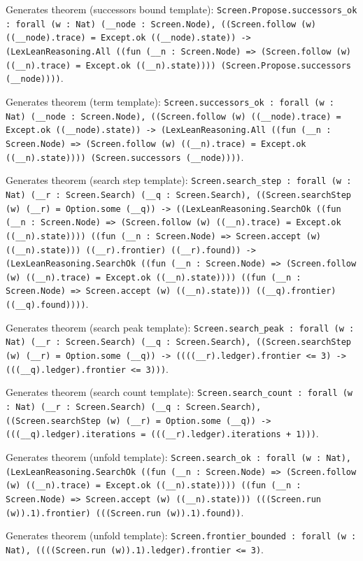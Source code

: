 \documentclass[11pt]{article}
\begin{document}
\noindent Generates theorem (successors bound template): \texttt{Screen.Propose.successors\_ok : forall (w : Nat) (\_\_node : Screen.Node), ((Screen.follow (w) ((\_\_node).trace) = Except.ok ((\_\_node).state)) -> (LexLeanReasoning.All ((fun (\_\_n : Screen.Node) => (Screen.follow (w) ((\_\_n).trace) = Except.ok ((\_\_n).state)))) (Screen.Propose.successors (\_\_node))))}.\par
\noindent Generates theorem (term template): \texttt{Screen.successors\_ok : forall (w : Nat) (\_\_node : Screen.Node), ((Screen.follow (w) ((\_\_node).trace) = Except.ok ((\_\_node).state)) -> (LexLeanReasoning.All ((fun (\_\_n : Screen.Node) => (Screen.follow (w) ((\_\_n).trace) = Except.ok ((\_\_n).state)))) (Screen.successors (\_\_node))))}.\par
\noindent Generates theorem (search step template): \texttt{Screen.search\_step : forall (w : Nat) (\_\_r : Screen.Search) (\_\_q : Screen.Search), ((Screen.searchStep (w) (\_\_r) = Option.some (\_\_q)) -> ((LexLeanReasoning.SearchOk ((fun (\_\_n : Screen.Node) => (Screen.follow (w) ((\_\_n).trace) = Except.ok ((\_\_n).state)))) ((fun (\_\_n : Screen.Node) => Screen.accept (w) ((\_\_n).state))) ((\_\_r).frontier) ((\_\_r).found)) -> (LexLeanReasoning.SearchOk ((fun (\_\_n : Screen.Node) => (Screen.follow (w) ((\_\_n).trace) = Except.ok ((\_\_n).state)))) ((fun (\_\_n : Screen.Node) => Screen.accept (w) ((\_\_n).state))) ((\_\_q).frontier) ((\_\_q).found))))}.\par
\noindent Generates theorem (search peak template): \texttt{Screen.search\_peak : forall (w : Nat) (\_\_r : Screen.Search) (\_\_q : Screen.Search), ((Screen.searchStep (w) (\_\_r) = Option.some (\_\_q)) -> ((((\_\_r).ledger).frontier <= 3) -> (((\_\_q).ledger).frontier <= 3)))}.\par
\noindent Generates theorem (search count template): \texttt{Screen.search\_count : forall (w : Nat) (\_\_r : Screen.Search) (\_\_q : Screen.Search), ((Screen.searchStep (w) (\_\_r) = Option.some (\_\_q)) -> (((\_\_q).ledger).iterations = (((\_\_r).ledger).iterations + 1)))}.\par
\noindent Generates theorem (unfold template): \texttt{Screen.search\_ok : forall (w : Nat), (LexLeanReasoning.SearchOk ((fun (\_\_n : Screen.Node) => (Screen.follow (w) ((\_\_n).trace) = Except.ok ((\_\_n).state)))) ((fun (\_\_n : Screen.Node) => Screen.accept (w) ((\_\_n).state))) (((Screen.run (w)).1).frontier) (((Screen.run (w)).1).found))}.\par
\noindent Generates theorem (unfold template): \texttt{Screen.frontier\_bounded : forall (w : Nat), ((((Screen.run (w)).1).ledger).frontier <= 3)}.\par
\end{document}

